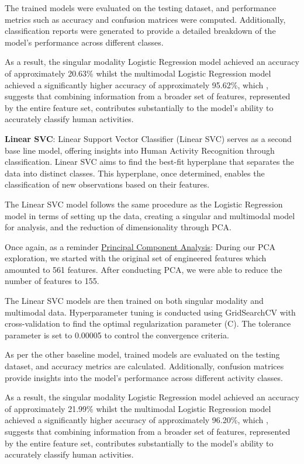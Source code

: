 \documentclass[conference]{IEEEtran}
\begin{document}
The trained models were evaluated on the testing dataset, and performance metrics such as accuracy and confusion matrices were computed. Additionally, classification reports were generated to provide a detailed breakdown of the model's performance across different classes.

As a result, the singular modality Logistic Regression model achieved an accuracy of approximately 20.63\% whilst the multimodal Logistic Regression model achieved a significantly higher accuracy of approximately 95.62\%, which , suggests that combining information from a broader set of features, represented by the entire feature set, contributes substantially to the model's ability to accurately classify human activities.


\textbf{Linear SVC}: 
Linear Support Vector Classifier (Linear SVC) serves as a second base line model, offering insights into Human Activity Recognition through classification. Linear SVC aims to find the best-fit hyperplane that separates the data into distinct classes. This hyperplane, once determined, enables the classification of new observations based on their features.

The Linear SVC model follows the same procedure as the Logistic Regression model in terms of setting up the data, creating a singular and multimodal model for analysis, and the reduction of dimensionality through PCA.

Once again, as a reminder \newline 
\underline{Principal Component Analysis}: During our PCA exploration, we started with the original set of engineered features which amounted to 561 features. After conducting PCA, we were able to reduce the number of features to 155. 


The Linear SVC models are then trained on both singular modality and multimodal data. Hyperparameter tuning is conducted using GridSearchCV with cross-validation to find the optimal regularization parameter (C). The tolerance parameter is set to 0.00005 to control the convergence criteria.

As per the other baseline model, trained models are evaluated on the testing dataset, and accuracy metrics are calculated. Additionally, confusion matrices provide insights into the model's performance across different activity classes.

As a result, the singular modality Logistic Regression model achieved an accuracy of approximately 21.99\% whilst the multimodal Logistic Regression model achieved a significantly higher accuracy of approximately 96.20\%, which , suggests that combining information from a broader set of features, represented by the entire feature set, contributes substantially to the model's ability to accurately classify human activities. \newline 
\end{document}
